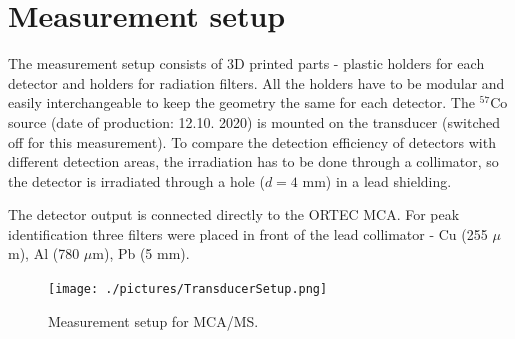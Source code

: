 \section{Measurement setup}
The measurement setup consists of 3D printed parts - plastic holders for each detector and holders for radiation filters. All the holders have to be modular and easily interchangeable to keep the geometry the same for each detector.
The $^{57}$Co source (date of production: 12.10. 2020) is mounted on the transducer (switched off for this measurement). To compare the detection efficiency of detectors with different detection areas, the irradiation has to be done through a collimator, so the detector is irradiated through a hole ($d = 4$ mm) in a lead shielding.
\par
The detector output is connected directly to the ORTEC MCA. For peak identification three filters were placed in front of the lead collimator - Cu (255 $\mu$m), Al (780 $\mu$m), Pb (5 mm).



\begin{figure}[H]
 \centering
 \texttt{[image: ./pictures/TransducerSetup.png]}
 \caption{Measurement setup for MCA/MS.}
 \label{meas setup}
 
\end{figure}

